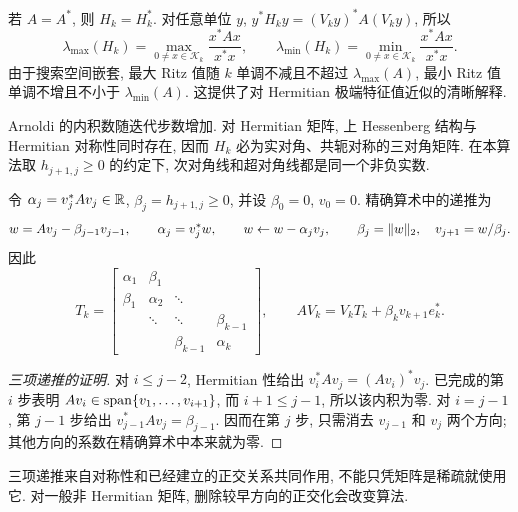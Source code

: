 若 $A=A^*$, 则 $H_k=H_k^*$. 对任意单位 $y$, $y^*H_ky=(V_ky)^*A(V_ky)$, 所以
\[
\lambda_{\max}(H_k)=\max_{0\ne x\in\mathcal K_k}\frac{x^*Ax}{x^*x},\qquad
\lambda_{\min}(H_k)=\min_{0\ne x\in\mathcal K_k}\frac{x^*Ax}{x^*x}.
\]
由于搜索空间嵌套, 最大 Ritz 值随 $k$ 单调不减且不超过 $\lambda_{\max}(A)$, 最小 Ritz 值单调不增且不小于 $\lambda_{\min}(A)$. 这提供了对 Hermitian 极端特征值近似的清晰解释.

Arnoldi 的内积数随迭代步数增加. 对 Hermitian 矩阵, 上 Hessenberg 结构与 Hermitian 对称性同时存在, 因而 $H_k$ 必为实对角、共轭对称的三对角矩阵. 在本算法取 $h_{j+1,j}\ge0$ 的约定下, 次对角线和超对角线都是同一个非负实数.

令 $\alpha_j=v_j^*Av_j\in\mathbb R$, $\beta_j=h_{j+1,j}\ge0$, 并设 $\beta_0=0$, $v_0=0$. 精确算术中的递推为
\begin{equation}\label{eq:lanczos-step}
 w=Av_j-\beta_{j-1}v_{j-1},\qquad
 \alpha_j=v_j^*w,\qquad
 w\leftarrow w-\alpha_jv_j,\qquad
 \beta_j=\lVert w\rVert_2,\quad v_{j+1}=w/\beta_j.
\end{equation}
因此
\[
T_k=\begin{bmatrix}
\alpha_1&\beta_1&&\\
\beta_1&\alpha_2&\ddots&\\
&\ddots&\ddots&\beta_{k-1}\\
&&\beta_{k-1}&\alpha_k
\end{bmatrix},\qquad
AV_k=V_kT_k+\beta_kv_{k+1}e_k^*.
\]

\begin{proof}[三项递推的证明]
对 $i\le j-2$, Hermitian 性给出 $v_i^*Av_j=(Av_i)^*v_j$. 已完成的第 $i$ 步表明 $Av_i\in\operatorname{span}\{v_1,\ldots,v_{i+1}\}$, 而 $i+1\le j-1$, 所以该内积为零. 对 $i=j-1$, 第 $j-1$ 步给出 $v_{j-1}^*Av_j=\beta_{j-1}$. 因而在第 $j$ 步, 只需消去 $v_{j-1}$ 和 $v_j$ 两个方向; 其他方向的系数在精确算术中本来就为零.
\end{proof}
三项递推来自对称性和已经建立的正交关系共同作用, 不能只凭矩阵是稀疏就使用它. 对一般非 Hermitian 矩阵, 删除较早方向的正交化会改变算法.

